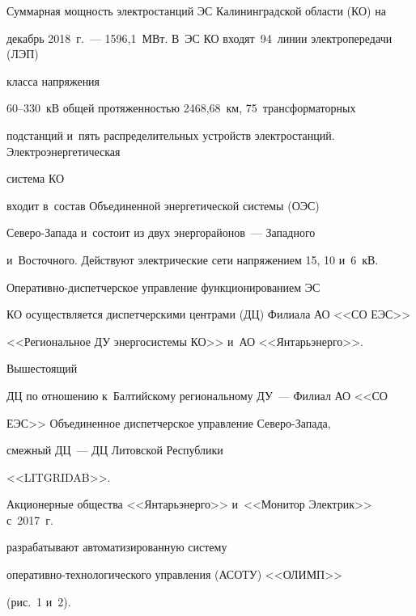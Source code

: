   Суммарная мощность электростанций ЭС Калининградской области (КО) на 


декабрь 2018~г.~--- 1596,1~МВт. В~ЭС КО входят~94~линии электропередачи (ЛЭП)


класса напряжения 


60--330~кВ общей протяженностью 2468,68~км, 75~трансформаторных 


подстанций и~пять распределительных устройств электростанций. Электроэнергетическая


система КО 


входит в~состав Объединенной энергетической системы (ОЭС)  


Се\-ве\-ро-За\-па\-да и~состоит из двух энергорайонов~--- Западного 


и~Восточного. Действуют электрические сети напряжением 15, 10 и~6~кВ.  


Опе\-ра\-тив\-но-дис\-пет\-чер\-ское управление  функционированием ЭС 


КО осуществляется диспетчерскими центрами (ДЦ) Филиала АО <<СО ЕЭС>> 


<<Региональное ДУ энергосистемы КО>> и~АО <<Янтарьэнерго>>. 


Вышестоящий\linebreak\vspace*{-12pt}





\pagebreak





\noindent


 ДЦ по отношению к~Балтийскому региональному ДУ~--- Филиал АО <<СО 


ЕЭС>> Объединенное диспетчерское управление Се\-ве\-ро-За\-па\-да, 


смежный ДЦ~--- ДЦ Литовской Республики 


<<LITGRIDAB>>.


  


  Акционерные общества <<Янтарьэнерго>> и~<<Монитор Электрик>> с~2017~г.\ 


разрабатывают автоматизированную систему  


опе\-ра\-тив\-но-тех\-но\-ло\-ги\-че\-ско\-го управ\-ле\-ния (АСОТУ) <<ОЛИМП>> 


(рис.~1 и~2). 


  











